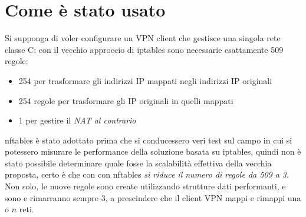 \section{Come è stato usato}
Si supponga di voler configurare un VPN client che gestisce una singola rete classe C:
con il vecchio approccio di iptables sono necessarie esattamente
509 regole:
\begin{itemize}
  \item 254 per trasformare gli indirizzi IP mappati negli indirizzi IP originali
  \item 254 regole per trasformare gli IP originali in quelli mappati
  \item 1 per gestire il \textit{NAT al contrario}
\end{itemize}
nftables è stato adottato prima che si conducessero veri test sul campo
in cui si potessero misurare le performance della soluzione basata su iptables,
quindi
non è stato possibile determinare quale fosse la scalabilità effettiva della vecchia
proposta, certo è che con con nftables \textit{si riduce il numero di regole
da 509 a 3}. Non solo, le nuove regole sono create utilizzando strutture
dati performanti, e sono e rimarranno sempre 3, a prescindere che il client VPN
mappi e rimappi una o $n$ reti.


